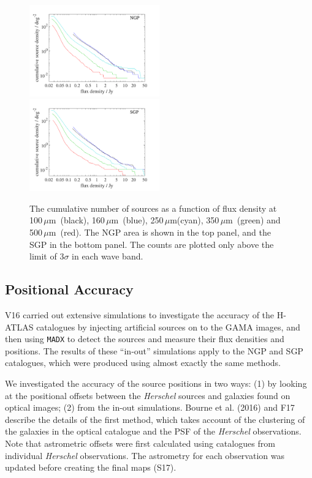 \documentclass[a4paper,fleqn,usenatbib, twocolumn]{aastex61}
\def\mic{\,$\mu $m}
\begin{document}
\begin{figure}
\textsl{}  \includegraphics[width=0.5\textwidth]{cum_counts_best_NGP.pdf}\\
  \includegraphics[width=0.5\textwidth]{cum_counts_best_SGP.pdf}
  \caption{\protect\label{fig_cum_flux} The cumulative number of
    sources as a function of flux density at 100\mic\ (black), 160\mic\ (blue),
    250\mic (cyan), 350\mic\ (green) and 500\mic\ (red). The NGP area is
    shown in the top panel, and the SGP in the bottom panel. The
    counts are plotted only above the limit of 3$\sigma$ in each wave
    band.  }
\end{figure}  

\subsection{Positional Accuracy}

V16 carried out extensive simulations to investigate the accuracy of
the H-ATLAS catalogues by injecting artificial sources on to the GAMA
images, and then using {\tt MADX} to detect the sources and measure their
flux densities and positions. The results of these ``in-out''
simulations apply to the NGP and SGP catalogues, which were produced
using almost exactly the same methods.

We investigated the accuracy of the source positions in two ways: (1)
by looking at the positional offsets between the {\it Herschel}
sources and galaxies found on optical images; (2) from the in-out
simulations.  Bourne et al. (2016) and F17 describe the details of the
first method, which takes account of the clustering of the galaxies in
the optical catalogue and the PSF of the {\it Herschel} observations.
Note that astrometric offsets were first calculated using catalogues
from individual {\it Herschel} observations. The astrometry for each
observation was updated before creating the final maps (S17).
\end{document}
